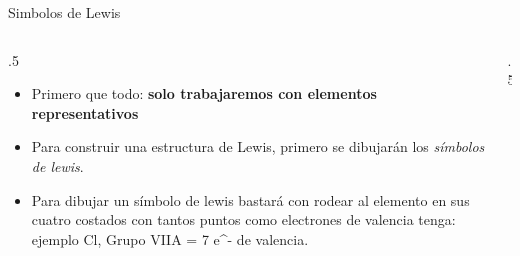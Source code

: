 \documentclass[11pt, aspectratio=169, xcolor=table]{beamer}
\begin{document}
\begin{frame}{Simbolos de Lewis}
  \begin{columns}
    \begin{column}{.5\textwidth}
      \begin{itemize}[<+->]
        \item Primero que todo: \textbf{solo trabajaremos con elementos representativos}
        \item Para construir una estructura de Lewis, primero se dibujarán los \textit{símbolos de lewis}.
        \item Para dibujar un símbolo de lewis bastará con rodear al elemento en sus cuatro costados con tantos puntos como electrones de valencia tenga: ejemplo Cl, Grupo VIIA = 7 e^- de valencia.
      \end{itemize}
    \end{column}

    \begin{column}{.5\textwidth}
      \Huge
      \centering
    \end{column}
  \end{columns}

\end{frame}
\end{document}

